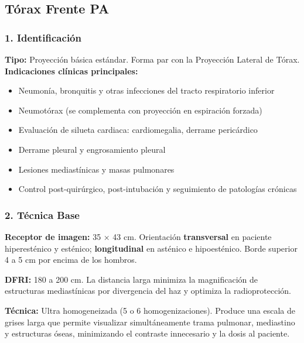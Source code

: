 \clearpage


\subsection{Tórax Frente PA}

\subsubsection*{1. Identificación}
\textbf{Tipo:} Proyección básica estándar. Forma par con la Proyección Lateral de Tórax.\\

\textbf{Indicaciones clínicas principales:}

\begin{itemize}
  \item Neumonía, bronquitis y otras infecciones del tracto respiratorio inferior
  \item Neumotórax (se complementa con proyección en espiración forzada)
  \item Evaluación de silueta cardiaca: cardiomegalia, derrame pericárdico
  \item Derrame pleural y engrosamiento pleural
  \item Lesiones mediastínicas y masas pulmonares
  \item Control post-quirúrgico, post-intubación y seguimiento de patologías crónicas
\end{itemize}

\subsubsection*{2. Técnica Base}

\textbf{Receptor de imagen:} 35 × 43 cm. Orientación \textbf{transversal} en paciente hiperesténico y esténico; \textbf{longitudinal} en asténico e hipoesténico. Borde superior 4 a 5 cm por encima de los hombros.

\textbf{DFRI:} 180 a 200 cm. La distancia larga minimiza la magnificación de estructuras mediastínicas por divergencia del haz y optimiza la radioprotección.

\textbf{Técnica:} Ultra homogeneizada (5 o 6 homogenizaciones). Produce una escala de grises larga que permite visualizar simultáneamente trama pulmonar, mediastino y estructuras óseas, minimizando el contraste innecesario y la dosis al paciente.

